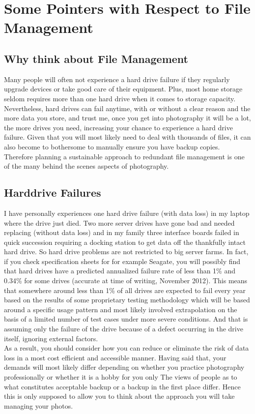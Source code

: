 \chapter{Some Pointers with Respect to File Management}

\section{Why think about File Management}

Many people will often not experience a hard drive failure if they regularly upgrade devices or take good care of their equipment. Plus, most home storage seldom requires more than one hard drive when it comes to storage capacity. Nevertheless, hard drives can fail anytime, with or without a clear reason and the more data you store, and trust me, once you get into photography it will be a lot, the more drives you need, increasing your chance to experience a hard drive failure. Given that you will most likely need to deal with thousands of files, it can also become to bothersome to manually ensure you have backup copies.
\\[\baselineskip]
Therefore planning a sustainable approach to redundant file management is one of the many behind the scenes aspects of photography.

\section{Harddrive Failures}

I have personally experiences one hard drive failure (with data loss) in my laptop where the drive just died. Two more server drives have gone bad and needed replacing (without data loss) and in my family three interface boards failed in quick succession requiring a docking station to get data off the thankfully intact hard drive.
So hard drive problems are not restricted to big server farms. In fact, if you check specification sheets for for example Seagate, you will possibly find that hard drives have a predicted annualized failure rate of less than 1\% and 0.34\% for some drives (accurate at time of writing, November 2012).
This means that somewhere around less than 1\% of all drives are expected to fail every year based on the results of some proprietary testing methodology which will be based around a specific usage pattern and most likely involved extrapolation on the basis of a limited number of test cases under more severe conditions. And that is assuming only the failure of the drive because of a defect occurring in the drive itself, ignoring external factors.
\\[\baselineskip]
As a result, you should consider how you can reduce or eliminate the risk of data loss in a most cost efficient and accessible manner. Having said that, your demands will most likely differ depending on whether you practice photography professionally or whether it is a hobby for you only
The views of people as to what constitutes acceptable backup or a backup in the first place differ. Hence this is only supposed to allow you to think about the approach you will take managing your photos.

